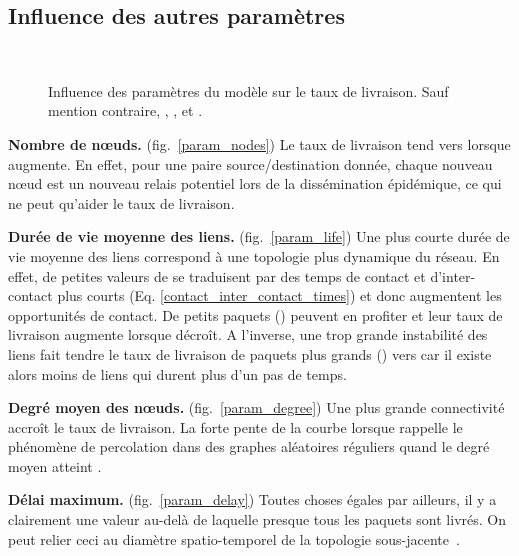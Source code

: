 \documentclass{article-cfip}
\begin{document}
{\subsection{Influence des autres paramètres}
\label{params}

\begin{figure}[t]
  \centering
   \qquad
   \\
   \qquad
  \caption{Influence des paramètres du modèle sur le taux de
    livraison. Sauf mention contraire, , ,
     et .}
  \label{params_influence}
\end{figure}

\noindent\textbf{Nombre de n{\oe}uds.}  (fig.~\ref{param_nodes}) Le taux
de livraison tend vers  lorsque  augmente. En effet, pour une
paire source/destination donnée, chaque nouveau n{\oe}ud est un nouveau
relais potentiel lors de la dissémination épidémique, ce qui ne peut
qu'aider le taux de livraison.

\noindent\textbf{Durée de vie moyenne des liens.}
(fig.~\ref{param_life}) Une plus courte durée de vie moyenne des liens
correspond à une topologie plus dynamique du réseau. En effet, de
petites valeurs de  se traduisent par des temps de contact et
d'inter-contact plus courts (Eq. \ref{contact_inter_contact_times}) et
donc augmentent les opportunités de contact. De petits paquets
() peuvent en profiter et leur taux de livraison
augmente lorsque  décroît. A l'inverse, une trop grande instabilité
des liens fait tendre le taux de livraison de paquets plus grands
() vers  car il existe alors moins de liens qui durent
plus d'un pas de temps.

\noindent\textbf{Degré moyen des n{\oe}uds.}  (fig.~\ref{param_degree})
Une plus grande connectivité accroît le taux de livraison. La forte
pente de la courbe lorsque  rappelle le phénomène de
percolation dans des graphes aléatoires réguliers quand le degré moyen
atteint .

\noindent\textbf{Délai maximum.} (fig.~\ref{param_delay}) Toutes
choses égales par ailleurs, il y a clairement une valeur au-delà de
laquelle presque tous les paquets sont livrés. On peut relier ceci au
diamètre spatio-temporel de la topologie
sous-jacente~\cite{chaintreau_diam}.


}
\end{document}
